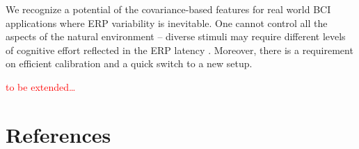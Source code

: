 \documentclass[12pt]{iopart}
\begin{document}

We recognize a potential of the covariance-based features
for real world BCI applications where ERP variability is inevitable. 
One cannot control all the aspects of the natural environment --
diverse stimuli may require different levels of cognitive
effort reflected in the ERP latency \cite{kutas_augmenting_1977}.
Moreover, there is a requirement on efficient calibration and 
a quick switch to a new setup.

\textcolor{red}{to be extended\ldots}


\section*{References}



\end{document}
